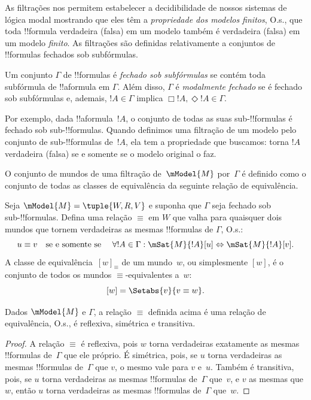 \documentclass[../../../include/open-logic-section]{subfiles}
\begin{document}


As filtrações nos permitem estabelecer a decidibilidade de nossos
sistemas de lógica modal mostrando que eles têm a \emph{propriedade
  dos modelos finitos}, O.s.\@, que toda !!{formula} verdadeira
(falsa) em um modelo também é verdadeira (falsa) em um modelo
\emph{finito}. As filtrações são definidas relativamente a conjuntos
de !!{formula}s fechados sob subfórmulas.

\begin{defn}
  Um conjunto $\Gamma$ de !!{formula}s é \emph{fechado sob
  subfórmulas} se contém toda subfórmula de !!a{formula} em $\Gamma$.
  Além disso, $\Gamma$ é \emph{modalmente fechado} se é fechado sob
  subfórmulas e, ademais, $!A \in \Gamma$ implica $\Box!A,
  \Diamond!A \in \Gamma$. 
\end{defn}

Por exemplo, dada !!a{formula}~$!A$, o conjunto de todas as suas
sub-!!{formula}s é fechado sob sub-!!{formula}s. Quando definimos uma
filtração de um modelo pelo conjunto de sub-!!{formula}s de~$!A$, ela
tem a propriedade que buscamos: torna $!A$ verdadeira (falsa) se e
somente se o modelo original o faz.

O conjunto de mundos de uma filtração de~$\mModel{M}$ por~$\Gamma$ é
definido como o conjunto de todas as classes de equivalência da
seguinte relação de equivalência.

\begin{defn}
Seja $\mModel{M} =\tuple{W, R, V}$ e suponha que $\Gamma$ seja fechado
sob sub-!!{formula}s. Defina uma relação $\equiv$ em $W$ que valha para
quaisquer dois mundos que tornem verdadeiras as mesmas !!{formula}s de
$\Gamma$, O.s.:
\[
u \equiv v \quad \text{se e somente se } \quad
\forall !A \in \Gamma : \mSat{M}{!A}[u] \Leftrightarrow \mSat{M}{!A}[v].
\]
A classe de equivalência~$[w]_\equiv$ de um mundo~$w$, ou simplesmente
$[w]$, é o conjunto de todos os mundos $\equiv$-equivalentes a~$w$:
\[
[w] = \Setabs{v}{v \equiv w}.
\]
\end{defn}

\begin{prop}
  Dados $\mModel{M}$ e $\Gamma$, a relação $\equiv$ definida acima é
  uma relação de equivalência, O.s.\@, é reflexiva, simétrica e
  transitiva.
\end{prop}

\begin{proof}
  A relação $\equiv$ é reflexiva, pois $w$ torna verdadeiras exatamente
  as mesmas !!{formula}s de~$\Gamma$ que ele próprio. É simétrica,
  pois, se $u$ torna verdadeiras as mesmas !!{formula}s de~$\Gamma$
  que $v$, o mesmo vale para $v$ e~$u$. Também é transitiva, pois, se
  $u$ torna verdadeiras as mesmas !!{formula}s de~$\Gamma$ que~$v$, e
  $v$ as mesmas que $w$, então $u$ torna verdadeiras as mesmas
  !!{formula}s de~$\Gamma$ que~$w$.
\end{proof}
\end{document}
